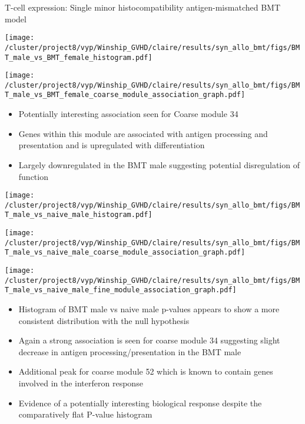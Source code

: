 \documentclass[final,hyperref={pdfpagelabels=false}]{beamer}
\begin{document}
\begin{frame}{}
\begin{columns}[t]
\begin{column}{.40\linewidth}
\begin{block}{T-cell expression: Single minor histocompatibility antigen-mismatched BMT model}
	\begin{minipage}{0.20\textwidth}
            \texttt{[image: /cluster/project8/vyp/Winship\_GVHD/claire/results/syn\_allo\_bmt/figs/BMT\_male\_vs\_BMT\_female\_histogram.pdf]}
          \end{minipage}
	\hfill
	\begin{minipage}{0.20\textwidth}
            \texttt{[image: /cluster/project8/vyp/Winship\_GVHD/claire/results/syn\_allo\_bmt/figs/BMT\_male\_vs\_BMT\_female\_coarse\_module\_association\_graph.pdf]}
            \end{minipage}
	\hfill
	\begin{minipage}{0.40\textwidth}
 {\small    \begin{itemize}
	\item Potentially interesting association seen for Coarse module 34 
	\item Genes within this module are associated with antigen processing and presentation and is upregulated with differentiation 
	\item Largely downregulated in the BMT male suggesting potential disregulation of function  
	\end{itemize}}  
	\end{minipage}
\hfill


	\begin{minipage}{0.30\textwidth}
            \texttt{[image: /cluster/project8/vyp/Winship\_GVHD/claire/results/syn\_allo\_bmt/figs/BMT\_male\_vs\_naive\_male\_histogram.pdf]}
          \end{minipage}
	  \hfill
          \begin{minipage}{0.30\textwidth}
            \texttt{[image: /cluster/project8/vyp/Winship\_GVHD/claire/results/syn\_allo\_bmt/figs/BMT\_male\_vs\_naive\_male\_coarse\_module\_association\_graph.pdf]}
          \end{minipage}
	  \hfill
	  \begin{minipage}{0.30\textwidth}
            \texttt{[image: /cluster/project8/vyp/Winship\_GVHD/claire/results/syn\_allo\_bmt/figs/BMT\_male\_vs\_naive\_male\_fine\_module\_association\_graph.pdf]}
          \end{minipage}
	  \hfill
 {\small \begin{itemize}
	\item Histogram of BMT male vs naive male p-values appears to show a more consistent distribution with the null hypothesis
	\item Again a strong association is seen for coarse module 34 suggesting slight decrease in antigen processing/presentation in the BMT male
	\item Additional peak for coarse module 52 which is known to contain genes involved in the interferon response 
	\item Evidence of a potentially interesting biological response despite the comparatively flat P-value histogram 
	\end{itemize}}
        \end{block}
      \end{column}



\end{columns}
\end{frame}
\end{document}
